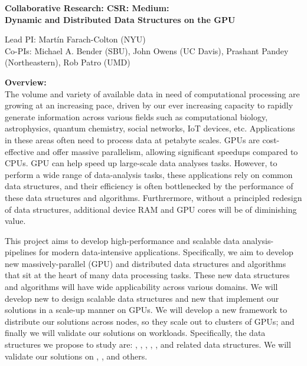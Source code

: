 
\begin{center}

\bf
\Large
Collaborative Research: CSR: Medium: \\Dynamic and Distributed Data Structures on the GPU

\small
Lead PI: Mart\'{i}n Farach-Colton (NYU) \\
Co-PIs: Michael A. Bender (SBU), John Owens (UC Davis), Prashant Pandey (Northeastern), Rob Patro (UMD)
\end{center}

\vspace{-0.3cm}

\noindent \textbf{\large Overview:}\\
The volume and variety of available data in need of computational processing are growing at an increasing pace, driven by our ever increasing capacity to rapidly generate information across various fields such as  computational biology, astrophysics, quantum chemistry, social networks, IoT devices, etc. Applications in these areas often need to process data at petabyte scales. 
GPUs are cost-effective and offer massive parallelism, allowing significant speedups compared to CPUs. GPU can help speed up large-scale data analyses tasks. However, to perform a wide range of data-analysis tasks, these applications rely on common data structures, and their efficiency is often bottlenecked by the performance of these data structures and algorithms. Furthrermore, without a principled redesign of data structures, additional device RAM and GPU cores will be of diminishing value.

This project aims to develop high-performance and scalable data analysis-pipelines for modern data-intensive applications. Specifically, we aim to develop new massively-parallel (GPU) and distributed data structures and algorithms that sit at the heart of many data processing tasks. These new data structures and algorithms will have wide applicability across various domains.
%
We will develop new  to design scalable data structures and new  that implement our solutions in a scale-up manner on GPUs. We will develop a new framework to distribute our solutions across nodes, so they scale out to clusters of GPUs; and finally we will validate our solutions on  workloads.
%
Specifically, the data structures we propose to study are: , , , , , and related data structures.  We will validate our solutions on , ,  and others.

